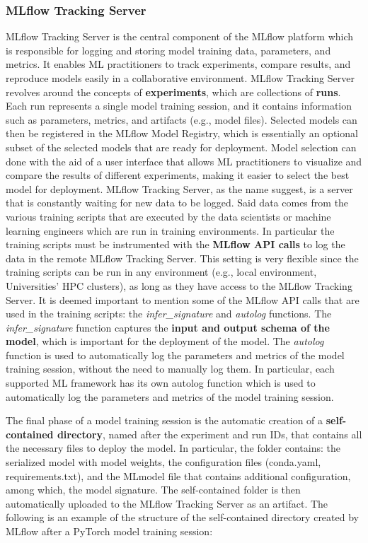 \subsubsection{MLflow Tracking Server}
MLflow Tracking Server is the central component of the MLflow platform which is responsible for logging and storing model training data, parameters, and metrics. 
It enables ML practitioners to track experiments, compare results, and reproduce models easily in a collaborative environment.
MLflow Tracking Server revolves around the concepts of \textbf{experiments}, which are collections of \textbf{runs}. 
Each run represents a single model training session, and it contains information such as parameters, metrics, and artifacts (e.g., model files).
Selected models can then be registered in the MLflow Model Registry, which is essentially an optional subset of the selected models that are ready for deployment.
Model selection can done with the aid of a user interface that allows ML practitioners to visualize and compare the results of different experiments, making it easier to select the best model for deployment.
MLflow Tracking Server, as the name suggest, is a server that is constantly waiting for new data to be logged. 
Said data comes from the various training scripts that are executed by the data scientists or machine learning engineers which are run in  training environments.
In particular the training scripts must be instrumented with the \textbf{MLflow API calls} to log the data in the remote MLflow Tracking Server.
This setting is very flexible since the training scripts can be run in any environment (e.g., local environment, Universities' HPC clusters), as long as they have access to the MLflow Tracking Server.
It is deemed important to mention some of the MLflow API calls that are used in the training scripts: the \textit{infer\_signature} and \textit{autolog} functions.
The \textit{infer\_signature} function captures the \textbf{input and output schema of the model}, which is important for the deployment of the model.
The \textit{autolog} function is used to automatically log the parameters and metrics of the model training session, without the need to manually log them. In particular, each supported ML framework has its own autolog function which is used to automatically log the parameters and metrics of the model training session.

The final phase of a model training session is the automatic creation of a \textbf{self-contained directory}, named after the experiment and run IDs, that contains all the necessary files to deploy the model. In particular, the folder contains: the serialized model with model weights, the configuration files (conda.yaml, requirements.txt), and the MLmodel file that contains additional configuration, among which, the model signature.
The self-contained folder is then automatically uploaded to the MLflow Tracking Server as an artifact.
The following is an example of the structure of the self-contained directory created by MLflow after a PyTorch model training session: \\

